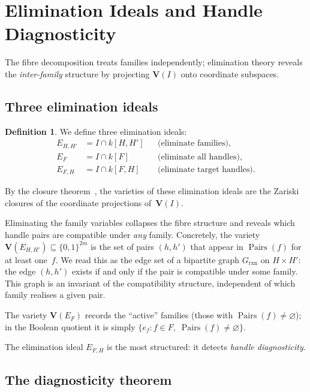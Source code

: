 \documentclass[preprint,12pt]{elsarticle}
\theoremstyle{definition}
\newtheorem{definition}[theorem]{Definition}
\theoremstyle{remark}
\newcommand{\kk}{k}
\newcommand{\Var}{\mathbf{V}}
\DeclareMathOperator{\Pairs}{Pairs}
\begin{document}
\section{Elimination Ideals and Handle Diagnosticity}\label{sec:elimination}

The fibre decomposition treats families independently; elimination
theory reveals the \emph{inter-family} structure by projecting
$\Var(I)$ onto coordinate subspaces.

\subsection{Three elimination ideals}

\begin{definition}\label{def:elim}
We define three elimination ideals:
\begin{align}
  E_{H,H'} &= I \cap \kk[H, H']
    &&\text{(eliminate families)}, \label{eq:ehh} \\
  E_F &= I \cap \kk[F]
    &&\text{(eliminate all handles)}, \label{eq:ef} \\
  E_{F,H} &= I \cap \kk[F, H]
    &&\text{(eliminate target handles)}. \label{eq:efh}
\end{align}
\end{definition}

By the closure theorem~\cite{CLO15}, the varieties of these
elimination ideals are the Zariski closures of the coordinate
projections of~$\Var(I)$.

Eliminating the family variables collapses the fibre
structure and reveals which handle pairs are compatible
under \emph{any} family.  Concretely, the variety
$\Var(E_{H,H'}) \subseteq \{0,1\}^{2m}$ is the set of
pairs $(h, h')$ that appear in $\Pairs(f)$ for at
least one~$f$.  We read this as the edge set of a bipartite
graph $G_{\mathrm{rxn}}$ on $H \times H'$: the edge
$(h, h')$ exists if and only if the pair is compatible
under some family.  This graph is an invariant of the
compatibility structure, independent of which family
realises a given pair.

The variety $\Var(E_F)$ records the ``active'' families
(those with $\Pairs(f) \neq \varnothing$); in the Boolean
quotient it is simply $\{e_f : f \in F,\; \Pairs(f) \neq
\varnothing\}$.

The elimination ideal $E_{F,H}$ is the most structured: it
detects \emph{handle diagnosticity}.


\subsection{The diagnosticity theorem}
\end{document}
